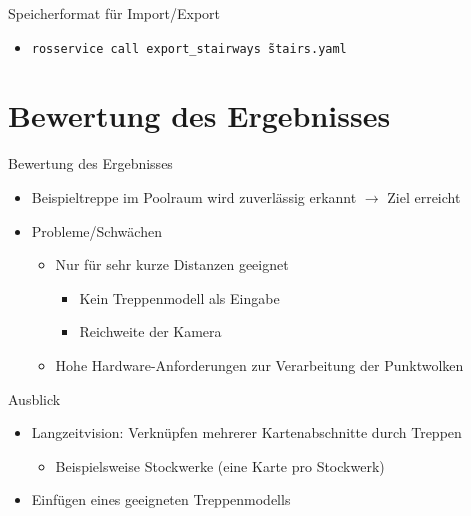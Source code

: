 \documentclass[18pt]{beamer}
\begin{document}
\begin{frame}{Speicherformat für Import/Export}
\begin{itemize}
	\item \texttt{rosservice call export\_stairways \~stairs.yaml}
\end{itemize}
\end{frame}



\section{Bewertung des Ergebnisses}

\begin{frame}{Bewertung des Ergebnisses}
\begin{itemize}
	\item Beispieltreppe im Poolraum wird zuverlässig erkannt \(\longrightarrow\) Ziel erreicht
	\item Probleme/Schwächen
	\begin{itemize}
		\item Nur für sehr kurze Distanzen geeignet
		\begin{itemize}
			\item Kein Treppenmodell als Eingabe
			\item Reichweite der Kamera
		\end{itemize}
		\item Hohe Hardware-Anforderungen zur Verarbeitung der Punktwolken
	\end{itemize}
\end{itemize}
\end{frame}

\begin{frame}{Ausblick}
\begin{itemize}
	\item Langzeitvision: Verknüpfen mehrerer Kartenabschnitte durch Treppen
	\begin{itemize}
		\item Beispielsweise Stockwerke (eine Karte pro Stockwerk)
	\end{itemize}
	\item Einfügen eines geeigneten Treppenmodells
\end{itemize}
\end{frame}
\end{document}
